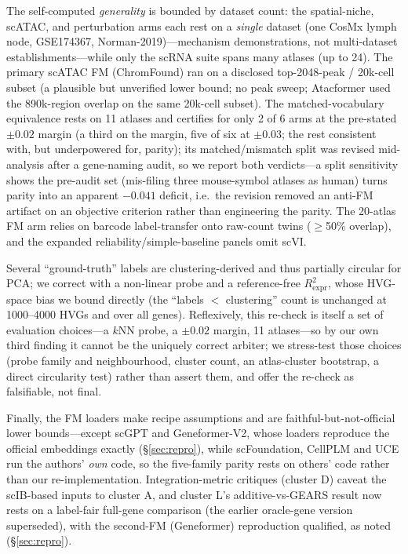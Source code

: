 \documentclass[fleqn,10pt,lineno]{wlpeerj}  %
\begin{document}
The self-computed \emph{generality} is bounded by dataset count: the spatial-niche, scATAC, and perturbation arms each rest on a \emph{single} dataset (one CosMx lymph node, GSE174367, Norman-2019)---mechanism demonstrations, not multi-dataset establishments---while only the scRNA suite spans many atlases (up to 24). The primary scATAC FM (ChromFound) ran on a disclosed top-2048-peak / 20k-cell subset (a plausible but unverified lower bound; no peak sweep; Atacformer used the 890k-region overlap on the same 20k-cell subset). The matched-vocabulary equivalence rests on 11 atlases and certifies for only 2 of 6 arms at the pre-stated $\pm0.02$ margin (a third on the margin, five of six at $\pm0.03$; the rest consistent with, but underpowered for, parity); its matched/mismatch split was revised mid-analysis after a gene-naming audit, so we report both verdicts---a split sensitivity shows the pre-audit set (mis-filing three mouse-symbol atlases as human) turns parity into an apparent $-0.041$ deficit, i.e.\ the revision removed an anti-FM artifact on an objective criterion rather than engineering the parity. The 20-atlas FM arm relies on barcode label-transfer onto raw-count twins ($\geq$50\% overlap), and the expanded reliability/simple-baseline panels omit scVI.

Several ``ground-truth'' labels are clustering-derived and thus partially circular for PCA; we correct with a non-linear probe and a reference-free $R^2_{\mathrm{expr}}$, whose HVG-space bias we bound directly (the ``labels $<$ clustering'' count is unchanged at 1000--4000 HVGs and over all genes). Reflexively, this re-check is itself a set of evaluation choices---a $k$NN probe, a $\pm0.02$ margin, 11 atlases---so by our own third finding it cannot be the uniquely correct arbiter; we stress-test those choices (probe family and neighbourhood, cluster count, an atlas-cluster bootstrap, a direct circularity test) rather than assert them, and offer the re-check as falsifiable, not final.

Finally, the FM loaders make recipe assumptions and are faithful-but-not-official lower bounds---except scGPT and Geneformer-V2, whose loaders reproduce the official embeddings exactly (\S\ref{sec:repro}), while scFoundation, CellPLM and UCE run the authors' \emph{own} code, so the five-family parity rests on others' code rather than our re-implementation. Integration-metric critiques (cluster D) caveat the scIB-based inputs to cluster A, and cluster L's additive-vs-GEARS result now rests on a label-fair full-gene comparison (the earlier oracle-gene version superseded), with the second-FM (Geneformer) reproduction qualified, as noted (\S\ref{sec:repro}).
\end{document}
